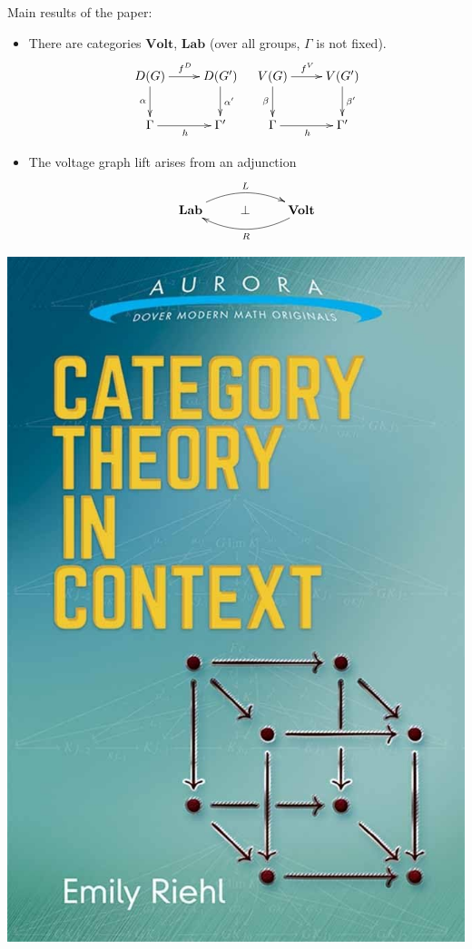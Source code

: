 \documentclass{beamer}
\newcommand{\Volt}{\mathbf{Volt}}
\newcommand{\Lab}{\mathbf{Lab}}
\begin{document}
\begin{frame}
Main results of the paper:
\begin{itemize}
\item There are categories $\Volt$, $\Lab$ (over all groups, $\Gamma$ is not fixed).
\[
\xymatrix{
D(G)
	\ar[r]^{f^D}
	\ar[d]_\alpha
&
D(G')
	\ar[d]^{\alpha'}
\\
\Gamma
	\ar[r]_h
&
\Gamma'
}
\quad
\xymatrix{
V(G)
	\ar[r]^{f^V}
	\ar[d]_\beta
&
V(G')
	\ar[d]^{\beta'}
\\
\Gamma
	\ar[r]_h
&
\Gamma'
}
\]
\item The voltage graph lift arises from an adjunction
$$
\xymatrix{
\Lab
	\ar@/^1.2pc/[rr]^-L
&
\bot
&
\Volt
	\ar@/^1.2pc/[ll]^-R
}
$$
\end{itemize}
\end{frame}
\begin{frame}
\hfill
\includegraphics[scale=0.2]{riehl.jpg}

\end{frame}
\end{document}
